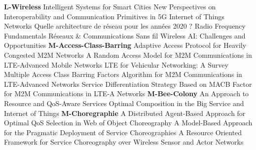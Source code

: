 \textbf{L-Wireless} \newline  \cite{alba_intelligent_2016} Intelligent {{Systems}} for {{Smart Cities}} \newline 
 \cite{iera_new_nodate} New Perspectives on Interoperability and Communication Primitives in {{5G Internet}} of {{Things}} Networks \newline 
 \cite{pujolle_quelle_nodate} Quelle architecture de réseau pour les années 2020 ? \newline 
 \cite{noauthor_radio_2014} Radio {{Frequency Fundamentals}} \newline 
 \cite{berder_reseaux_2014} Réseaux \& Communications Sans fil \newline 
 \cite{debbah_wireless_nodate} Wireless {{AI}}: {{Challenges}} and {{Opportunities}} \newline 
\textbf{M-Access-Class-Barring} \newline  \cite{bouzouita_adaptive_2016} Adaptive Access Protocol for Heavily Congested {{M2M}} Networks \newline 
 \cite{bouzouita_random_2015} A Random Access Model for {{M2M}} Communications in {{LTE}}-Advanced Mobile Networks \newline 
 \cite{araniti_lte_2013} {{LTE}} for Vehicular Networking: A Survey \newline 
 \cite{bouzouita_multiple_2015} Multiple {{Access Class Barring Factors Algorithm}} for {{M2M Communications}} in {{LTE}}-Advanced {{Networks}} \newline 
 \cite{zangar_service_2016} Service Differentiation Strategy Based on {{MACB}} Factor for {{M2M Communications}} in {{LTE}}-{{A Networks}} \newline 
\textbf{M-Bee-Colony} \newline  \cite{min_approach_2018} An {{Approach}} to {{Resource}} and {{QoS}}-{{Aware Services Optimal Composition}} in the {{Big Service}} and {{Internet}} of {{Things}} \newline 
\textbf{M-Choregraphie} \newline  \cite{temglit_distributed_2018} A {{Distributed Agent}}-{{Based Approach}} for {{Optimal QoS Selection}} in {{Web}} of {{Object Choreography}} \newline 
 \cite{gomes_modelbased_2016} A {{Model}}-{{Based Approach}} for the {{Pragmatic Deployment}} of {{Service Choreographies}} \newline 
 \cite{duhart_resource_2016} A {{Resource Oriented Framework}} for {{Service Choreography}} over {{Wireless Sensor}} and {{Actor Networks}} \newline 
